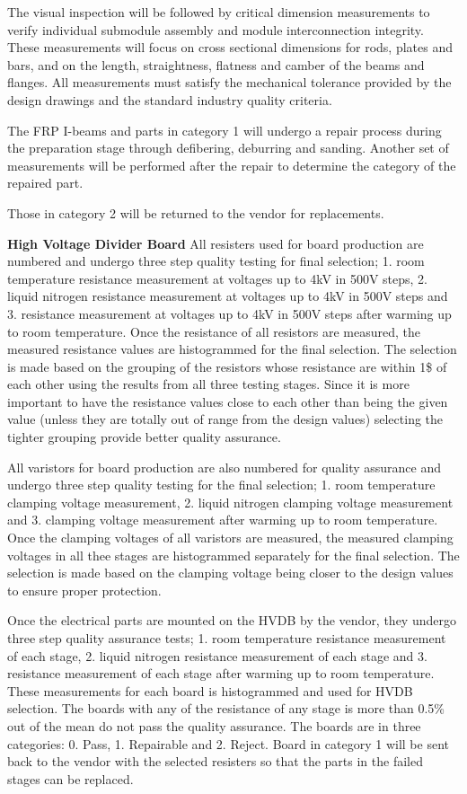 The visual inspection will be followed by critical dimension measurements to verify individual submodule assembly and module interconnection integrity.  These measurements will focus on cross sectional dimensions for rods, plates and bars, and on the length, straightness, flatness and camber of the beams and flanges.
All measurements must satisfy the mechanical tolerance provided by the design drawings and the standard industry quality criteria.

The FRP I-beams and parts in category 1 will undergo a repair process during the preparation stage through defibering, deburring and sanding.  Another set of measurements will be performed after the repair to determine the category of the repaired part.

Those in category 2 will be returned to the vendor for replacements.

{\bf High Voltage Divider Board}
All resisters used for board production are numbered and undergo three step quality testing for final selection; 1. room temperature resistance measurement at voltages up to 4kV in 500V steps, 2. liquid nitrogen resistance measurement at voltages up to 4kV in 500V steps and 3. resistance measurement at voltages up to 4kV in 500V steps after warming up to room temperature.  Once the resistance of all resistors are measured, the measured resistance values are histogrammed for the final selection.   The selection is made based on the grouping of the resistors whose resistance are within 1\$ of each other using the results from all three testing stages.   Since it is more important to have the resistance values close to each other than being the given value (unless they are totally out of range from the design values) selecting the tighter grouping provide better quality assurance.

All varistors for board production are also numbered for quality assurance and undergo three step quality testing for the final selection; 1. room temperature clamping voltage measurement, 2. liquid nitrogen clamping voltage measurement and 3. clamping voltage measurement after warming up to room temperature.  Once the clamping voltages of all varistors are measured, the measured clamping voltages in all thee stages are histogrammed separately for the final selection.   The selection is made based on the clamping voltage being closer to the design values to ensure proper protection.   

Once the electrical parts are mounted on the HVDB by the vendor, they undergo three step quality assurance tests; 1. room temperature resistance measurement of each stage, 2. liquid nitrogen resistance measurement of each stage and 3. resistance measurement of each stage after warming up to room temperature.  These measurements for each board is histogrammed and used for HVDB selection.  The boards with any of the resistance of any stage is more than 0.5\% out of the mean do not pass the quality assurance.  The boards are in three categories: 0. Pass, 1. Repairable and 2. Reject.  Board in category 1 will be sent back to the vendor with the selected resisters so that the parts in the failed stages can be replaced.

